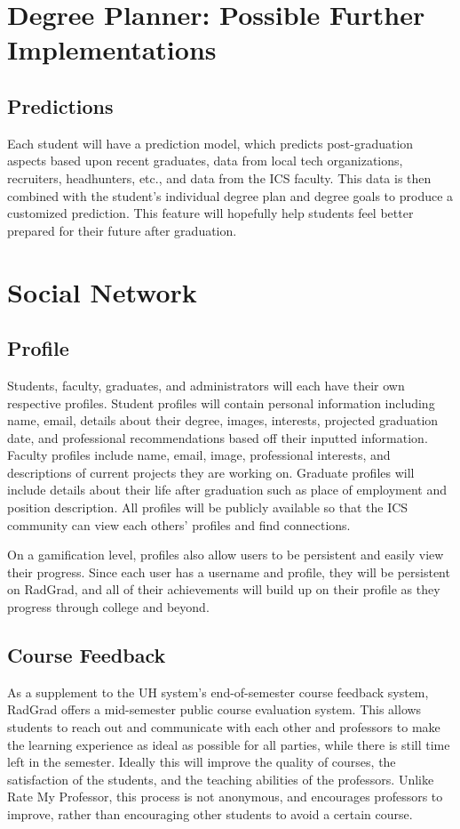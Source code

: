 \section{Degree Planner: Possible Further Implementations}
\subsection{Predictions}
Each student will have a prediction model, which predicts post-graduation aspects based upon recent graduates, data from local tech organizations, recruiters, headhunters, etc., and data from the ICS faculty. This data is then combined with the student's individual degree plan and degree goals to produce a customized prediction.  This feature will hopefully help students feel better prepared for their future after graduation.

\section{Social Network}
\subsection{Profile}
Students, faculty, graduates, and administrators will each have their own respective profiles. Student profiles will contain personal information including name, email, details about their degree, images, interests, projected graduation date, and professional recommendations based off their inputted information. Faculty profiles include name, email, image, professional interests, and descriptions of current projects they are working on. Graduate profiles will include details about their life after graduation such as place of employment and position description. All profiles will be publicly available so that the ICS community can view each others' profiles and find connections. 

On a gamification level, profiles also allow users to be persistent and easily view their progress. Since each user has a username and profile, they will be persistent on RadGrad, and all of their achievements will build up on their profile as they progress through college and beyond.
\subsection{Course Feedback}
As a supplement to the UH system's end-of-semester course feedback system, RadGrad offers a mid-semester public course evaluation system. This allows students to reach out and communicate with each other and professors to make the learning experience as ideal as possible for all parties, while there is still time left in the semester. Ideally this will improve the quality of courses, the satisfaction of the students, and the teaching abilities of the professors. Unlike Rate My Professor, this process is not anonymous, and encourages professors to improve, rather than encouraging other students to avoid a certain course. 
